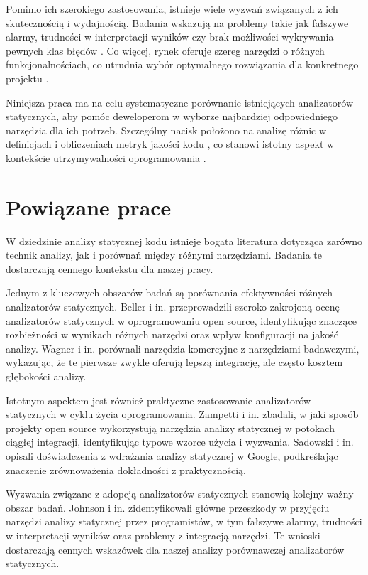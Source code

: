 \documentclass[a4paper,12pt]{article}
\begin{document}
Pomimo ich szerokiego zastosowania, istnieje wiele wyzwań związanych z ich skutecznością i wydajnością. Badania wskazują na problemy takie jak fałszywe alarmy, trudności w interpretacji wyników czy brak możliwości wykrywania pewnych klas błędów \cite{johnson2013dont}. Co więcej, rynek oferuje szereg narzędzi o różnych funkcjonalnościach, co utrudnia wybór optymalnego rozwiązania dla konkretnego projektu \cite{novak2010comparison}.

Niniejsza praca ma na celu systematyczne porównanie istniejących analizatorów statycznych, aby pomóc deweloperom w wyborze najbardziej odpowiedniego narzędzia dla ich potrzeb. Szczególny nacisk położono na analizę różnic w definicjach i obliczeniach metryk jakości kodu \cite{mccabe1976complexity, halstead1977elements}, co stanowi istotny aspekt w kontekście utrzymywalności oprogramowania \cite{heinemann2014measuring}.

\section{Powiązane prace}

W dziedzinie analizy statycznej kodu istnieje bogata literatura dotycząca zarówno technik analizy, jak i porównań między różnymi narzędziami. Badania te dostarczają cennego kontekstu dla naszej pracy.

Jednym z kluczowych obszarów badań są porównania efektywności różnych analizatorów statycznych. Beller i in. \cite{beller2016analyzing} przeprowadzili szeroko zakrojoną ocenę analizatorów statycznych w oprogramowaniu open source, identyfikując znaczące rozbieżności w wynikach różnych narzędzi oraz wpływ konfiguracji na jakość analizy. Wagner i in. \cite{wagner2018static} porównali narzędzia komercyjne z narzędziami badawczymi, wykazując, że te pierwsze zwykle oferują lepszą integrację, ale często kosztem głębokości analizy.

Istotnym aspektem jest również praktyczne zastosowanie analizatorów statycznych w cyklu życia oprogramowania. Zampetti i in. \cite{zampetti2017how} zbadali, w jaki sposób projekty open source wykorzystują narzędzia analizy statycznej w potokach ciągłej integracji, identyfikując typowe wzorce użycia i wyzwania. Sadowski i in. \cite{sadowski2018lessons} opisali doświadczenia z wdrażania analizy statycznej w Google, podkreślając znaczenie zrównoważenia dokładności z praktycznością.

Wyzwania związane z adopcją analizatorów statycznych stanowią kolejny ważny obszar badań. Johnson i in. \cite{johnson2013dont} zidentyfikowali główne przeszkody w przyjęciu narzędzi analizy statycznej przez programistów, w tym fałszywe alarmy, trudności w interpretacji wyników oraz problemy z integracją narzędzi. Te wnioski dostarczają cennych wskazówek dla naszej analizy porównawczej analizatorów statycznych.
\end{document}
